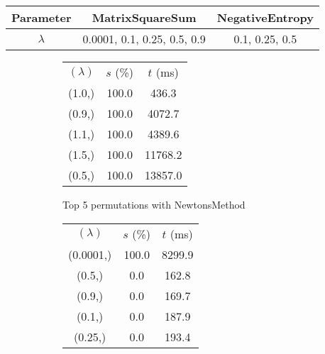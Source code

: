 \begin{center}
\label{tab:params_ConstantSearch}
\begin{tabular}{|c|c|c|}
\hline
\rowcolor{gray!25}
Parameter & MatrixSquareSum & NegativeEntropy \\
\hline
$\lambda$ & 0.0001, 0.1, 0.25, 0.5, 0.9 & 0.1, 0.25, 0.5 \\
\hline
\end{tabular}
\end{center}

\begin{figure}[H]
\label{fig:param_comp_MatrixSquareSum_ConstantSearch}
\begin{subfigure}[ht]{.5\textwidth}
\begin{tabular}{|c|c|c|}
\hline
\rowcolor{gray!25}
\multicolumn{3}{|c|}{NewtonsMethod} \\
\hline
\rowcolor{gray!25}
$(\lambda)$ & $s$ (\%) & $t$ (ms) \\
\hline
(1.0,) & 100.0 & 436.3 \\
(0.9,) & 100.0 & 4072.7 \\
(1.1,) & 100.0 & 4389.6 \\
(1.5,) & 100.0 & 11768.2 \\
(0.5,) & 100.0 & 13857.0 \\
\hline
\end{tabular}
\caption{Top 5 permutations with NewtonsMethod}
\label{subfig:param_comp_MatrixSquareSum_NewtonsMethod_ConstantSearch}
\end{subfigure}
\hfill
\begin{subfigure}[ht]{.5\textwidth}
\begin{tabular}{|c|c|c|}
\hline
\rowcolor{gray!25}
\multicolumn{3}{|c|}{GradientDescentMethod} \\
\hline
\rowcolor{gray!25}
$(\lambda)$ & $s$ (\%) & $t$ (ms) \\
\hline
(0.0001,) & 100.0 & 8299.9 \\
(0.5,) & 0.0 & 162.8 \\
(0.9,) & 0.0 & 169.7 \\
(0.1,) & 0.0 & 187.9 \\
(0.25,) & 0.0 & 193.4 \\
\hline
\end{tabular}

\end{subfigure}
\end{figure}

